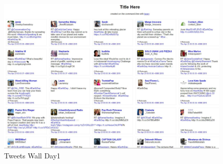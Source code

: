 \begin{figure}[ht]
	\begin{center}
		 \includegraphics[scale=0.40]{Day1Wall}
		  \caption{Tweets Wall Day1}
	 \end{center}
\end{figure}

